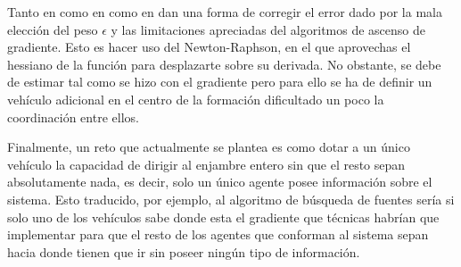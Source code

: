 Tanto en como en \cite{Estimacion_Gradiente} como en \cite{Adicional_Estimacion_1} dan una forma de corregir el error dado por la mala elección del peso $\epsilon$ y las limitaciones apreciadas del algoritmos de ascenso de gradiente. Esto es hacer uso del Newton-Raphson, en el que aprovechas el hessiano de la función para desplazarte sobre su derivada. No obstante, se debe de estimar tal como se hizo con el gradiente pero para ello se ha de definir un vehículo adicional en el centro de la formación dificultado un poco la coordinación entre ellos.

Finalmente, un reto que actualmente se plantea es como dotar a un único vehículo la capacidad de dirigir al enjambre entero sin que el resto sepan absolutamente nada, es decir, solo un único agente posee información sobre el sistema. Esto traducido, por ejemplo, al algoritmo de búsqueda de fuentes sería si solo uno de los vehículos sabe donde esta el gradiente que técnicas habrían que implementar para que el resto de los agentes que conforman al sistema sepan hacia donde tienen que ir sin poseer ningún tipo de información.